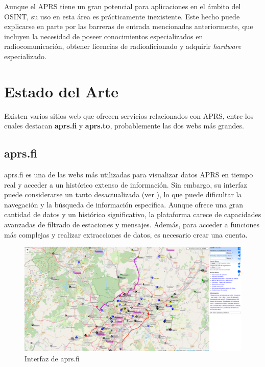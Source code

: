Aunque el APRS tiene un gran potencial para aplicaciones en el ámbito del OSINT, su uso en esta área es prácticamente inexistente. Este hecho puede explicarse en parte por las barreras de entrada mencionadas anteriormente, que incluyen la necesidad de poseer conocimientos especializados en radiocomunicación, obtener licencias de radioaficionado y adquirir \textit{hardware} especializado.

\section{Estado del Arte}

Existen varios sitios web que ofrecen servicios relacionados con APRS, entre los cuales destacan \textbf{aprs.fi} y \textbf{aprs.to}, probablemente las dos webs más grandes.

\subsection{aprs.fi}

aprs.fi es una de las webs más utilizadas para visualizar datos APRS en tiempo real y acceder a un histórico extenso de información. Sin embargo, su interfaz puede considerarse un tanto desactualizada (ver ), lo que puede dificultar la navegación y la búsqueda de información específica. Aunque ofrece una gran cantidad de datos y un histórico significativo, la plataforma carece de capacidades avanzadas de filtrado de estaciones y mensajes. Además, para acceder a funciones más complejas y realizar extracciones de datos, es necesario crear una cuenta.

\begin{figure}[h]
    \centering
    \includegraphics[width=1\textwidth]{Imagenes/Chapter_2/aprs-fi.png}
    \caption{Interfaz de aprs.fi}
    \label{fig:aprs-fi}
\end{figure}

